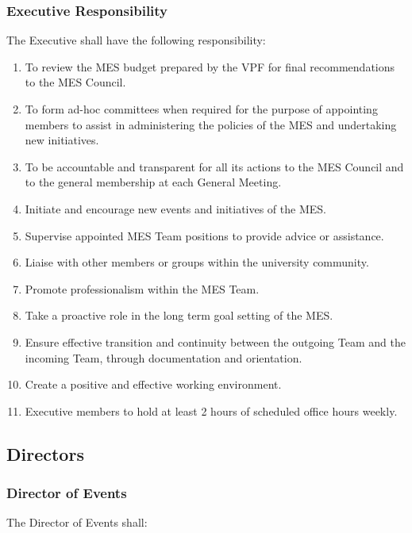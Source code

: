 \subsubsection{Executive Responsibility}
\label{executive-responsibility}
The Executive shall have the following responsibility:

\begin{enumerate}
 \item
  To review the MES budget prepared by the VPF for final recommendations to the MES Council.
 \item
  To form ad-hoc committees when required for the purpose of appointing members to assist in administering the policies of the MES and undertaking new initiatives.
 \item
  To be accountable and transparent for all its actions to the MES Council and to the general membership at each General Meeting.
 \item
  Initiate and encourage new events and initiatives of the MES.
 \item
  Supervise appointed MES Team positions to provide advice or assistance.
 \item
  Liaise with other members or groups within the university community.
 \item
  Promote professionalism within the MES Team.
 \item
  Take a proactive role in the long term goal setting of the MES.
 \item
  Ensure effective transition and continuity between the outgoing Team and the incoming Team, through documentation and orientation.
 \item
  Create a positive and effective working environment.
 \item
  Executive members to hold at least 2 hours of scheduled office hours weekly.

\end{enumerate}

\subsection{Directors}
\label{directors}

\subsubsection{Director of Events}
\label{director-of-events}

The Director of Events shall:

